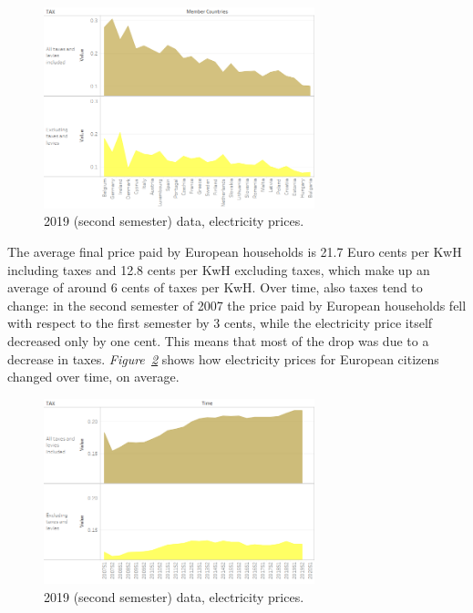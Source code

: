 \documentclass[a4paper,12pt]{book}
\begin{document}
\begin{figure}[tb]
\begin{center}
\captionsetup{justification=centering}
\includegraphics[width=0.7\textwidth]{Images/Taxes.png}
\caption{2019 (second semester) data, electricity prices. }
\label{fig:2019}
\end{center}
\end{figure}

The average final price paid by European households is 21.7 Euro cents per KwH including taxes and 12.8 cents per KwH excluding taxes, which make up an average of around 6 cents of taxes per KwH. Over time, also taxes tend to change: in the second semester of 2007 the price paid by European households fell with respect to the first semester by 3 cents, while the electricity price itself decreased only by one cent. This means that most of the drop was due to a decrease in taxes. \textit{Figure~\ref{fig:TaxesTime}} shows how electricity prices for European citizens changed over time, on average.

\begin{figure}[tb]
\begin{center}
\captionsetup{justification=centering}
\includegraphics[width=0.7\textwidth]{Images/TaxesTime.png}
\caption{2019 (second semester) data, electricity prices. }
\label{fig:TaxesTime}
\end{center}
\end{figure}
\end{document}

